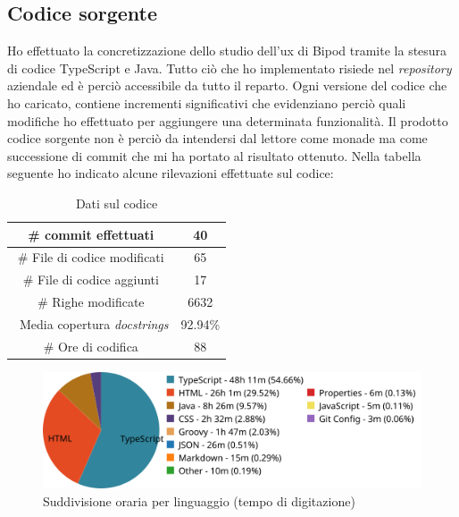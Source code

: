 \subsection{Codice sorgente}
Ho effettuato la concretizzazione dello studio dell'\acrshort{ux} di Bipod tramite la stesura di codice TypeScript e Java. Tutto ciò che ho implementato risiede nel \textit{repository} aziendale ed è perciò accessibile da tutto il reparto. Ogni versione del codice che ho caricato, contiene incrementi significativi che evidenziano perciò quali modifiche ho effettuato per aggiungere una determinata funzionalità. Il prodotto codice sorgente non è perciò da intendersi dal lettore come monade ma come successione di \gls{commit} che mi ha portato al risultato ottenuto.
Nella tabella seguente ho indicato alcune rilevazioni effettuate sul codice:
\begin{table}[H]
    \centering
    \begin{tabular}{|c|c|}
    \hline
        \# commit effettuati & 40 \\ \hline
        \# File di codice modificati & 65 \\ \hline
        \# File di codice aggiunti & 17 \\ \hline
        \# Righe modificate & 6632 \\ \hline
        \ Media copertura \textit{docstrings} & 92.94\% \\ \hline
        \# Ore di codifica & 88 \\ \hline
    \end{tabular}
    \caption{Dati sul codice}
    \label{tab:codeData}
\end{table}
\begin{figure}[H]
    \centering
    \includegraphics[width=0.9\columnwidth]{immagini/linguaggi.png}
    \caption{Suddivisione oraria per linguaggio (tempo di digitazione)}
    \label{fig:languages}
\end{figure}
